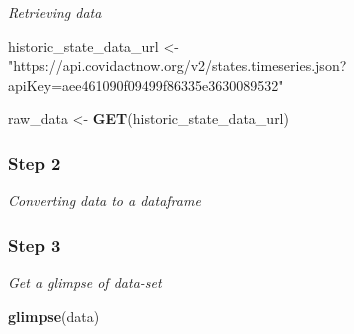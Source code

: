 \documentclass[
]{article}
\newenvironment{Shaded}{\begin{snugshade}}{\end{snugshade}}
\newcommand{\FunctionTok}[1]{\textcolor[rgb]{0.13,0.29,0.53}{\textbf{#1}}}
\newcommand{\NormalTok}[1]{#1}
\newcommand{\OtherTok}[1]{\textcolor[rgb]{0.56,0.35,0.01}{#1}}
\newcommand{\SpecialCharTok}[1]{\textcolor[rgb]{0.81,0.36,0.00}{\textbf{#1}}}
\newcommand{\StringTok}[1]{\textcolor[rgb]{0.31,0.60,0.02}{#1}}
\begin{document}
\emph{Retrieving data}

\begin{Shaded}
\begin{Highlighting}[]
\NormalTok{historic\_state\_data\_url }\OtherTok{\textless{}{-}} \StringTok{"https://api.covidactnow.org/v2/states.timeseries.json?apiKey=aee461090f09499f86335e3630089532"}

\NormalTok{raw\_data }\OtherTok{\textless{}{-}} \FunctionTok{GET}\NormalTok{(historic\_state\_data\_url)}
\end{Highlighting}
\end{Shaded}

\hypertarget{step-2}{%
\subsubsection{Step 2}\label{step-2}}

\emph{Converting data to a dataframe}

\begin{Shaded}
\end{Shaded}

\hypertarget{step-3}{%
\subsubsection{Step 3}\label{step-3}}

\emph{Get a glimpse of data-set}

\begin{Shaded}
\begin{Highlighting}[]
\FunctionTok{glimpse}\NormalTok{(data)}
\end{Highlighting}
\end{Shaded}
\end{document}
